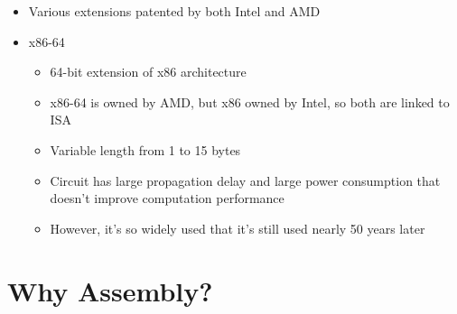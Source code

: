 \documentclass{article}
\begin{document}
\begin{itemize}
\begin{itemize}
			\item Various extensions patented by both Intel and AMD
			\item x86-64
			\begin{itemize}
				\item 64-bit extension of x86 architecture
				\item x86-64 is owned by AMD, but x86 owned by Intel, so both are linked to ISA
				\item Variable length from 1 to 15 bytes
				\item Circuit has large propagation delay and large power consumption that doesn't improve computation performance
				\item However, it's so widely used that it's still used nearly 50 years later
			\end{itemize}
		\end{itemize}
\end{itemize}

\section{Why Assembly?}
\end{document}
